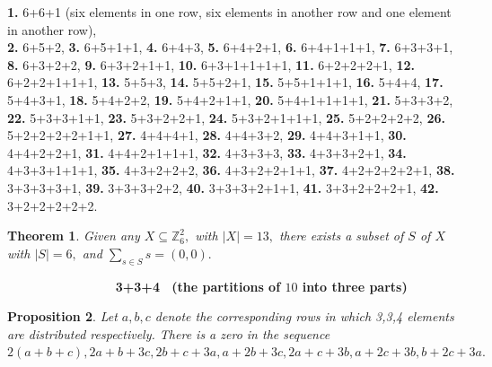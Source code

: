 \documentclass[reqno,10pt]{amsart}
\newtheorem{prop}{Proposition}[section]
\newtheorem{thm}[prop]{Theorem}
\begin{document}
{\bf 1.} 6+6+1 (six elements in one row, six elements in another row and one element in another row),\\
{\bf 2.} 6+5+2, {\bf 3.} 6+5+1+1, {\bf 4.} 6+4+3, {\bf 5.} 6+4+2+1, {\bf 6.} 6+4+1+1+1, {\bf 7.} 6+3+3+1, {\bf 8.}  6+3+2+2, {\bf 9.} 6+3+2+1+1, {\bf 10.} 6+3+1+1+1+1, {\bf 11.} 6+2+2+2+1, {\bf 12.}  6+2+2+1+1+1, {\bf 13.}  5+5+3, {\bf 14.} 5+5+2+1, {\bf 15.} 5+5+1+1+1, {\bf 16.} 5+4+4, {\bf 17.}  5+4+3+1, {\bf 18.} 5+4+2+2, {\bf 19.} 5+4+2+1+1, {\bf 20.} 5+4+1+1+1+1,
{\bf 21.} 5+3+3+2, {\bf 22.} 5+3+3+1+1, {\bf 23.} 5+3+2+2+1, {\bf 24.} 5+3+2+1+1+1, {\bf 25.} 5+2+2+2+2, {\bf 26.} 5+2+2+2+2+1+1, {\bf 27.} 4+4+4+1, {\bf 28.} 4+4+3+2, {\bf 29.} 4+4+3+1+1, {\bf 30.} 4+4+2+2+1, {\bf 31.} 4+4+2+1+1+1, {\bf 32.} 4+3+3+3, {\bf 33.} 4+3+3+2+1, {\bf 34.} 4+3+3+1+1+1, {\bf 35.} 4+3+2+2+2, {\bf 36.} 4+3+2+2+1+1, {\bf 37.} 4+2+2+2+2+1, {\bf 38.} 3+3+3+3+1, {\bf 39.} 3+3+3+2+2, {\bf 40.} 3+3+3+2+1+1, {\bf 41.} 3+3+2+2+2+1, {\bf 42.} 3+2+2+2+2+2.
\begin{thm}\label{Main Theorem}
Given any $X \subseteq \mathbb{Z}_{6}^2,$ with $|X| = 13,$ there exists a subset of $S$ of $X$ with
$|S| = 6,$ and $\sum_{s \in S} s = (0,0).$
\end{thm}
\textbf{  \ \ \ \ \  \  \ \ \ \ \ \ \ \ \  3+3+4 \ (the partitions of $10$ into three parts)  }
\begin{prop}\label{Main Proposition 1}
Let $a,b,c$ denote the corresponding rows in which 3,3,4 elements are distributed respectively.
There is a zero in the sequence $2(a+b+c), 2a+b+3c, 2b+c+3a, a+2b+3c, 2a+c+3b,a+2c+3b,b+2c+3a.$ 
\end{prop}
\end{document}
